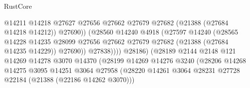 \begin{lexlean}{RustCore}
\begin{coremodule}
                                              @14211
                                              @14218
                                              @27627
                                              @27656
                                              @27662
                                              @27679
                                              @27682
                                              (@21388 (@27684 @14218 @14212))
                                              @27690))
                                          (@28560
                                            @14240
                                            @4918
                                            (@27597
                                              @14240
                                              (@28565
                                                @14228
                                                @14235
                                                @28099
                                                @27656
                                                @27662
                                                @27679
                                                @27682
                                                (@21388 (@27684 @14235 @14229))
                                                @27690))
                                            @27838))))
                                    @28186)
                                  (@28189
                                    @2144
                                    @2148
                                    @121
                                    @14269
                                    @14278
                                    @3070
                                    @14370
                                    (@28199
                                      @14269
                                      @14276
                                      @3240
                                      (@28206
                                        @14268
                                        @14275
                                        @3095
                                        @14251
                                        @3064
                                        @27958
                                        (@28220
                                          @14261
                                          @3064
                                          @28231
                                          @27728
                                          @22184
                                          (@21388 (@22186 @14262 @3070)))

\end{coremodule}
\end{lexlean}
